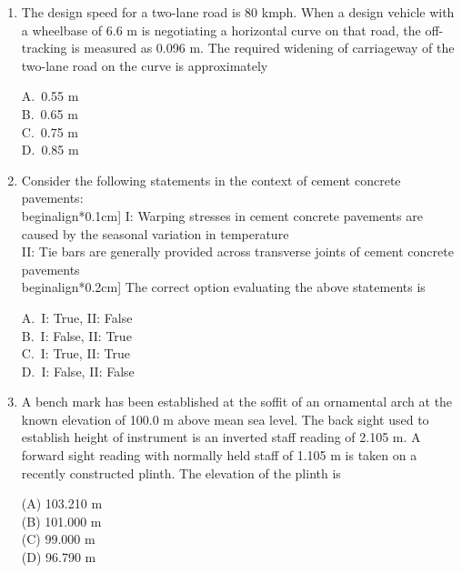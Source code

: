 \documentclass[journal,12pt,onecolumn]{IEEEtran}
\theoremstyle{remark}
\begin{document}
\begin{enumerate}
\noindent\item The design speed for a two-lane road is 80 kmph. When a design vehicle with a wheelbase of 6.6 m is negotiating a horizontal curve on that road, the off-tracking is measured as 0.096 m. The required widening of carriageway of the two-lane road on the curve is approximately
\\ \hfill{}
\begin{multicols}{4}
A.\ 0.55 m \\
B.\ 0.65 m \\
C.\ 0.75 m \\
D.\ 0.85 m
\end{multicols}

\noindent\item Consider the following statements in the context of cement concrete pavements: \\begin{align*}0.1cm]
I: Warping stresses in cement concrete pavements are caused by the seasonal variation in temperature \\ 
II: Tie bars are generally provided across transverse joints of cement concrete pavements \\begin{align*}0.2cm]
The correct option evaluating the above statements is
\hfill{}
\begin{multicols}{4}
A.\ I: True, II: False \\
B.\ I: False, II: True \\
C.\ I: True, II: True \\
D.\ I: False, II: False
\end{multicols}
\noindent\item A bench mark has been established at the soffit of an ornamental arch at the known elevation of 100.0 m above mean sea level. The back sight used to establish height of instrument is an inverted staff reading of 2.105 m. A forward sight reading with normally held staff of 1.105 m is taken on a recently constructed plinth. The elevation of the plinth is

\setlength{\parskip}{0.5cm}

\hfill{}

\begin{multicols}{4}
\noindent(A) 103.210 m\\
(B) 101.000 m\\
(C) 99.000 m\\
(D) 96.790 m
\end{multicols}


\end{enumerate}
\end{document}
